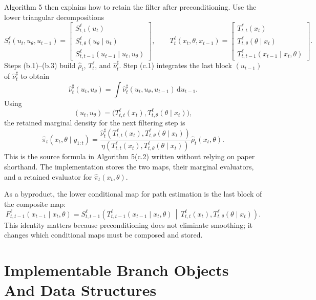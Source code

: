 \documentclass[11pt]{article}
\newcommand{\dd}{\,\mathrm d}
\begin{document}
Algorithm 5 then explains how to retain the filter after preconditioning.  Use
the lower triangular decompositions
\[
    S_t^{\ell}(u_t,u_\theta,u_{t-1})
    =
    \begin{bmatrix}
    S_{t,t}^{\ell}(u_t)\\
    S_{t,\theta}^{\ell}(u_\theta\mid u_t)\\
    S_{t,t-1}^{\ell}(u_{t-1}\mid u_t,u_\theta)
    \end{bmatrix},
    \qquad
    T_t^{\ell}(x_t,\theta,x_{t-1})
    =
    \begin{bmatrix}
    T_{t,t}^{\ell}(x_t)\\
    T_{t,\theta}^{\ell}(\theta\mid x_t)\\
    T_{t,t-1}^{\ell}(x_{t-1}\mid x_t,\theta)
    \end{bmatrix}.
    \tag{P14}
\]
Steps (b.1)--(b.3) build \(\widehat\rho_t\), \(T_t^\ell\), and
\(\widehat\nu_t^\sharp\).  Step (c.1) integrates the last block
\((u_{t-1})\) of \(\widehat\nu_t^\sharp\) to obtain
\[
    \widehat\nu_t^\sharp(u_t,u_\theta)
    =
    \int\widehat\nu_t^\sharp(u_t,u_\theta,u_{t-1})\dd u_{t-1}.
    \tag{P15}
\]
Using
\[
    (u_t,u_\theta)
    =
    \bigl(
    T_{t,t}^{\ell}(x_t),
    T_{t,\theta}^{\ell}(\theta\mid x_t)
    \bigr),
    \tag{P16}
\]
the retained marginal density for the next filtering step is
\[
    \widehat\pi_t(x_t,\theta\mid y_{1:t})
    =
    \frac{
    \widehat\nu_t^\sharp\!\left(
    T_{t,t}^{\ell}(x_t),
    T_{t,\theta}^{\ell}(\theta\mid x_t)
    \right)}
    {
    \eta\!\left(
    T_{t,t}^{\ell}(x_t),
    T_{t,\theta}^{\ell}(\theta\mid x_t)
    \right)}
    \widehat\rho_t(x_t,\theta).
    \tag{P17}
\]
This is the source formula in Algorithm 5(c.2) written without relying on
paper shorthand.  The implementation stores the two maps, their marginal
evaluators, and a retained evaluator for \(\widehat\pi_t(x_t,\theta)\).

As a byproduct, the lower conditional map for path estimation is the last block
of the composite map:
\[
    F_{t,t-1}^{\ell}(x_{t-1}\mid x_t,\theta)
    =
    S_{t,t-1}^{\ell}
    \!\left(
    T_{t,t-1}^{\ell}(x_{t-1}\mid x_t,\theta)
    \,\middle|\,
    T_{t,t}^{\ell}(x_t),
    T_{t,\theta}^{\ell}(\theta\mid x_t)
    \right).
    \tag{P18}
\]
This identity matters because preconditioning does not eliminate smoothing; it
changes which conditional maps must be composed and stored.

\section{Implementable Branch Objects And Data Structures}
\end{document}
